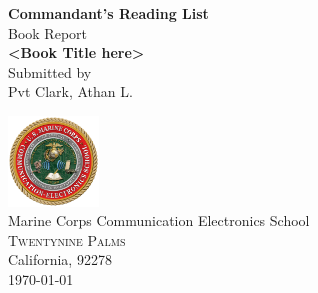 \begin{titlepage}

\begin{center}

\textup{\small {\bf Commandant's Reading List} \\ Book Report}\\[0.2in]

\Large \textbf {<Book Title here>}\\[0.5in]



\normalsize Submitted by \\
Pvt Clark, Athan L.


\vfill

\includegraphics[width=0.18\textwidth]{mcces-logo}\\[0.1in]
\Large{Marine Corps Communication Electronics School}\\
\normalsize
\textsc{Twentynine Palms}\\
California, 92278\\
\vspace{0.2cm}
\today{}

\end{center}

\end{titlepage}
